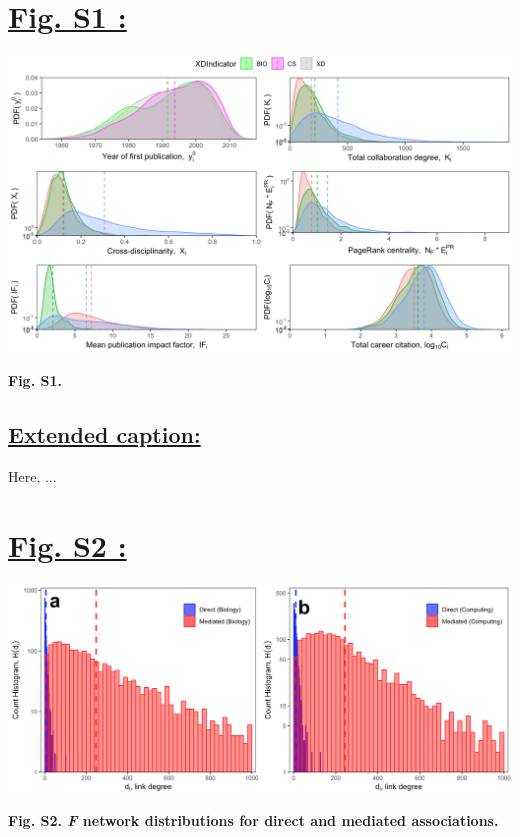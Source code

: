 \documentclass{article}\usepackage[]{graphicx}\usepackage[]{color}
\begin{document}
\newpage
\section*{\underline{Fig. S1 :}}
\begin{center}
\includegraphics[scale=0.4]{3_ggplot.png}
\newline
\par{\textbf{Fig. S1.}}
\end{center}
\subsection*{\underline{Extended caption:}}
\par{Here, ...}

\newpage
\section*{\underline{Fig. S2 :}}
\begin{center}
\includegraphics[scale=0.45]{S2.png}
\newline
\par{\textbf{Fig. S2. \textit{F} network distributions for direct and mediated associations.}}
\end{center}
\end{document}
